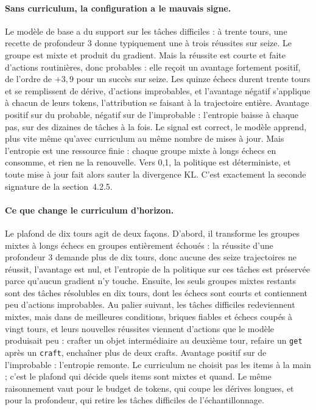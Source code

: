 \documentclass[11pt,a4paper]{article}
\begin{document}
\paragraph{Sans curriculum, la configuration a le mauvais signe.} Le modèle de base a du support sur les tâches difficiles : à trente tours, une recette de profondeur 3 donne typiquement une à trois réussites sur seize. Le groupe est mixte et produit du gradient. Mais la réussite est courte et faite d'actions routinières, donc probables : elle reçoit un avantage fortement positif, de l'ordre de $+3{,}9$ pour un succès sur seize. Les quinze échecs durent trente tours et se remplissent de dérive, d'actions improbables, et l'avantage négatif s'applique à chacun de leurs tokens, l'attribution se faisant à la trajectoire entière. Avantage positif sur du probable, négatif sur de l'improbable : l'entropie baisse à chaque pas, sur des dizaines de tâches à la fois. Le signal est correct, le modèle apprend, plus vite même qu'avec curriculum au même nombre de mises à jour. Mais l'entropie est une ressource finie : chaque groupe mixte à longs échecs en consomme, et rien ne la renouvelle. Vers 0{,}1, la politique est déterministe, et toute mise à jour fait alors sauter la divergence KL. C'est exactement la seconde signature de la section~4.2.5.

\paragraph{Ce que change le curriculum d'horizon.} Le plafond de dix tours agit de deux façons. D'abord, il transforme les groupes mixtes à longs échecs en groupes entièrement échoués : la réussite d'une profondeur 3 demande plus de dix tours, donc aucune des seize trajectoires ne réussit, l'avantage est nul, et l'entropie de la politique sur ces tâches est préservée parce qu'aucun gradient n'y touche. Ensuite, les seuls groupes mixtes restants sont des tâches résolubles en dix tours, dont les échecs sont courts et contiennent peu d'actions improbables. Au palier suivant, les tâches difficiles redeviennent mixtes, mais dans de meilleures conditions, briques fiables et échecs coupés à vingt tours, et leurs nouvelles réussites viennent d'actions que le modèle produisait peu : crafter un objet intermédiaire au deuxième tour, refaire un \texttt{get} après un \texttt{craft}, enchaîner plus de deux crafts. Avantage positif sur de l'improbable : l'entropie remonte. Le curriculum ne choisit pas les items à la main ; c'est le plafond qui décide quels items sont mixtes et quand. Le même raisonnement vaut pour le budget de tokens, qui coupe les dérives longues, et pour la profondeur, qui retire les tâches difficiles de l'échantillonnage.
\end{document}
